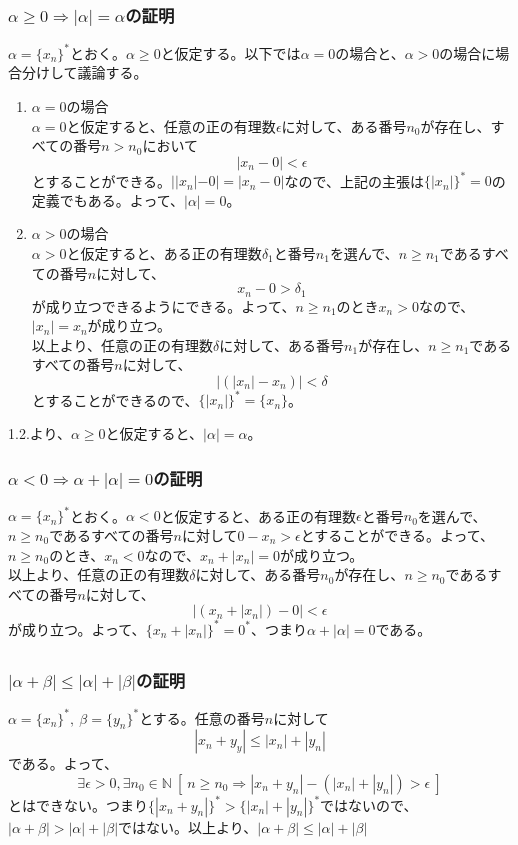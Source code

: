 \documentclass{jsarticle}
\begin{document}
\subsubsection{$\alpha\geq 0 \Longrightarrow |\alpha|=\alpha$の証明}
$\alpha=\{x_n\}^*$とおく。$\alpha\geq0$と仮定する。以下では$\alpha=0$の場合と、$\alpha>0$の場合に場合分けして議論する。
\begin{enumerate}
\item $\alpha=0$の場合\\
$\alpha=0$と仮定すると、任意の正の有理数$\epsilon$に対して、ある番号$n_0$が存在し、すべての番号$n>n_0$において
\[|x_n-0|<\epsilon\]
とすることができる。$||x_n|-0|=|x_n-0|$なので、上記の主張は$\{|x_n|\}^*=0$の定義でもある。よって、$|\alpha|=0$。
\item $\alpha>0$の場合\\
$\alpha>0$と仮定すると、ある正の有理数$\delta_1$と番号$n_1$を選んで、$n\geq n_1$であるすべての番号$n$に対して、
\[x_n-0>\delta_1\]
が成り立つできるようにできる。よって、$n\geq n_1$のとき$x_n>0$なので、$|x_n|=x_n$が成り立つ。\\
以上より、任意の正の有理数$\delta$に対して、ある番号$n_1$が存在し、$n\geq n_1$であるすべての番号$n$に対して、
\[|(|x_n|-x_n)|<\delta\]
とすることができるので、$\{|x_n|\}^*=\{x_n\}$。
\end{enumerate}
1.2.より、$\alpha\geq 0$と仮定すると、$|\alpha|=\alpha$。

\subsubsection{$\alpha < 0\Longrightarrow \alpha+|\alpha|=0$の証明}
$\alpha=\{x_n\}^*$とおく。$\alpha<0$と仮定すると、ある正の有理数$\epsilon$と番号$n_0$を選んで、$n\geq n_0$であるすべての番号$n$に対して$0-x_n>\epsilon$とすることができる。よって、$n\geq n_0$のとき、$x_n<0$なので、$x_n+|x_n|=0$が成り立つ。\\
以上より、任意の正の有理数$\delta$に対して、ある番号$n_0$が存在し、$n\geq n_0$であるすべての番号$n$に対して、
\[|(x_n+|x_n|)-0|<\epsilon\]
が成り立つ。よって、$\{x_n+|x_n|\}^*=0^*$、つまり$\alpha+|\alpha|=0$である。

\subsection{}
\subsubsection{$|\alpha+\beta| \leq|\alpha|+|\beta|$の証明}
$\alpha=\{x_n\}^*,\ \beta=\{y_n\}^*$とする。任意の番号$n$に対して
\[|x_n+y_y|\leq|x_n|+|y_n|\]
である。よって、
\[\exists \epsilon>0,\exists n_0\in\mathbb{N}\ [\ n\geq n_0\Longrightarrow |x_n+y_n|-(|x_n|+|y_n|)>\epsilon\ ]\]
とはできない。つまり$\{|x_n+y_n|\}^*>\{|x_n|+|y_n|\}^*$ではないので、$|\alpha+\beta|>|\alpha|+|\beta|$ではない。以上より、$|\alpha+\beta|\leq|\alpha|+|\beta|$
\end{document}
